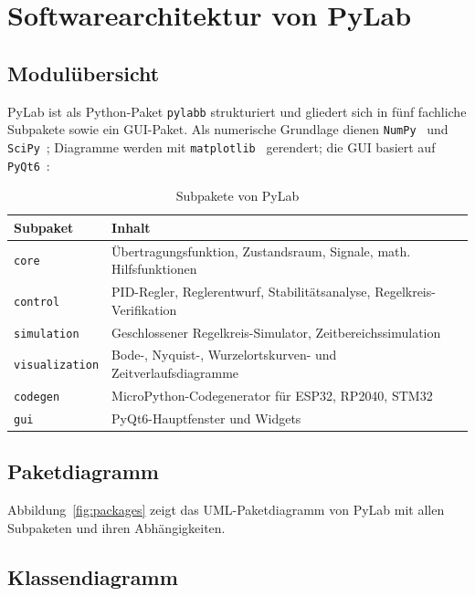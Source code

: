\documentclass[a4paper,12pt]{article}
\theoremstyle{definition}
\begin{document}
\section{Softwarearchitektur von PyLab}
\label{sec:architektur}

\subsection{Modulübersicht}

PyLab ist als Python-Paket \texttt{pylabb} strukturiert und gliedert sich in
fünf fachliche Subpakete sowie ein GUI-Paket. Als numerische Grundlage dienen
\texttt{NumPy}~\cite{numpy} und \texttt{SciPy}~\cite{scipy}; Diagramme werden
mit \texttt{matplotlib}~\cite{hunter} gerendert; die GUI basiert auf
\texttt{PyQt6}~\cite{qt6}:

\begin{table}[h]
\centering
\begin{tabular}{@{}lp{9cm}@{}}
\toprule
\textbf{Subpaket} & \textbf{Inhalt} \\
\midrule
\texttt{core}         & Übertragungsfunktion, Zustandsraum, Signale, math. Hilfsfunktionen \\
\texttt{control}      & PID-Regler, Reglerentwurf, Stabilitätsanalyse, Regelkreis-Verifikation \\
\texttt{simulation}   & Geschlossener Regelkreis-Simulator, Zeitbereichssimulation \\
\texttt{visualization}& Bode-, Nyquist-, Wurzelortskurven- und Zeitverlaufsdiagramme~\cite{hunter} \\
\texttt{codegen}      & MicroPython-Codegenerator für ESP32, RP2040, STM32 \\
\texttt{gui}          & PyQt6-Hauptfenster und Widgets \\
\bottomrule
\end{tabular}
\caption{Subpakete von PyLab}
\end{table}

\subsection{Paketdiagramm}

Abbildung~\ref{fig:packages} zeigt das UML-Paketdiagramm von PyLab mit allen
Subpaketen und ihren Abhängigkeiten.

\subsection{Klassendiagramm}
\end{document}
